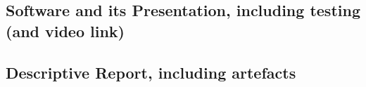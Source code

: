 \documentclass[a4paper]{article}
\begin{document}





%             
%             




\pagebreak




\pagebreak
\subsection{Software and its Presentation, including testing (and video link)}


\subsection{Descriptive Report, including artefacts}
\end{document}
